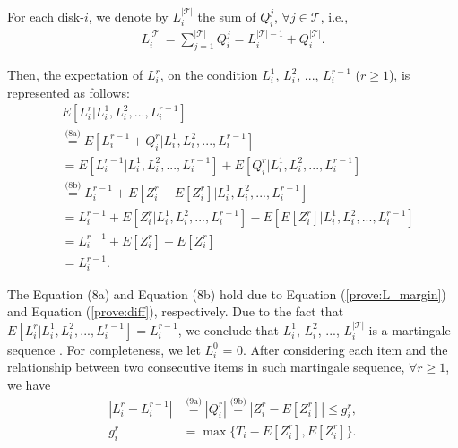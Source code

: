 \documentclass[conference]{IEEEtran}
\begin{document}
\vspace{-0.2cm}
For each disk-$i$, we denote by $L_i^{\mathcal{|T|}}$ the sum of $Q_i^j$, $\forall j \in \mathcal{T}$, i.e., 
 \vspace{-0.1cm}
\begin{align}
L_i^{\mathcal{|T|}} = \sum\nolimits_{j = 1}^{\mathcal{|T|}} Q_i^j
=  L_i^{\mathcal{|T|} - 1} + Q_i^{\mathcal{|T|}}. \label{prove:L_margin}
\end{align}

Then, the expectation of $L_i^{r}$, on the condition $L_i^{1}$, $L_i^{2}$, ..., $L_i^{r-1}$ ($r \geq 1$), is represented as follows:
\vspace{-0.1cm}
\begin{align}
&E[L_i^{r}|L_i^{1}, L_i^{2}, ..., L_i^{r-1}] \nonumber\\
&\overset{\text{(8a)}}{=}E[L_i^{r-1} + Q_i^{r} |L_i^{1}, L_i^{2}, ..., L_i^{r-1}] \nonumber\\
&\overset{\text{}}{=}E[L_i^{r-1} |L_i^{1}, L_i^{2}, ..., L_i^{r-1}]
+ E[Q_i^{r} |L_i^{1}, L_i^{2}, ..., L_i^{r-1}] \nonumber\\
&\overset{\text{(8b)}}{=}L_i^{r-1} + E[Z_i^r - E[Z_i^r] |L_i^{1}, L_i^{2}, ..., L_i^{r-1}]\nonumber\\
&=L_i^{r-1} + E[Z_i^r|L_i^{1}, L_i^{2}, ..., L_i^{r-1}]
-E[E[Z_i^r] |L_i^{1}, L_i^{2}, ..., L_i^{r-1}]\nonumber\\
&=L_i^{r-1} + E[Z_i^r] - E[Z_i^r]\nonumber\\
&=L_i^{r-1}.\label{prove:marginsq}
\end{align}

\vspace{-0.2cm}
The Equation (8a) and Equation (8b) hold due to Equation (\ref{prove:L_margin}) and Equation (\ref{prove:diff}), respectively. Due to the fact that $E[L_i^{r}|L_i^{1}, L_i^{2}, ..., L_i^{r-1}] = L_i^{r-1}$, we conclude that $L_i^{1}$, $L_i^{2}$, ..., $L_i^{|\mathcal{T}|}$ is a martingale sequence \cite{b13}. For completeness, we let $L_i^{0}$ = 0. After considering each item and the relationship between two consecutive items in such martingale sequence, $\forall r \geq 1$, we have
\vspace{-0.2cm}
\begin{align}
  |L_i^r - L_i^{r-1}|&\overset{\text{(9a)}}{=} |Q_i^{r}| \overset{\text{(9b)}}{=} |Z_i^r - E[Z_i^r]|\leq g_i^r, \label{prove:bound1}\\
  g_i^r &= \max\{T_i -  E[Z_i^r], E[Z_i^r]\}.\label{prove:bound}
\end{align}
\end{document}
